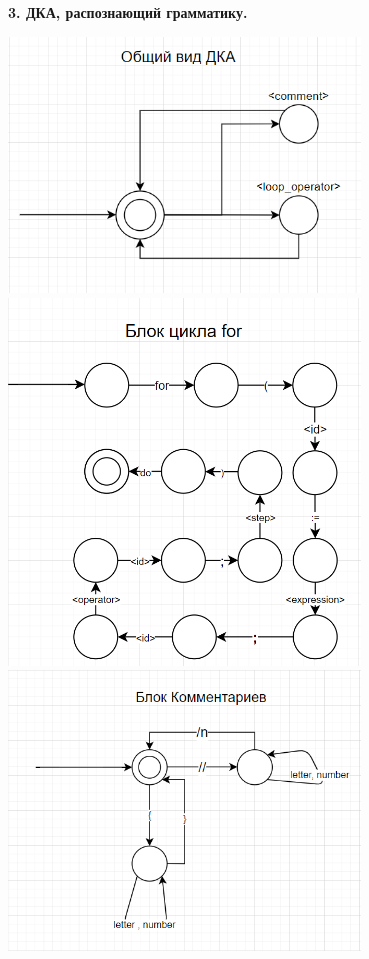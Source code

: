 \documentclass[12pt]{report}
\begin{document}
\begin{center}
\Large{\textbf{3. ДКА, распознающий грамматику.}}
\end{center}
\begin{center}
\includegraphics[width=0.7\textwidth]{assets/image.png}
\includegraphics[width=0.7\textwidth]{assets/for.png}
\includegraphics[width=0.7\textwidth]{assets/comment.png}

\end{center}
\end{document}
